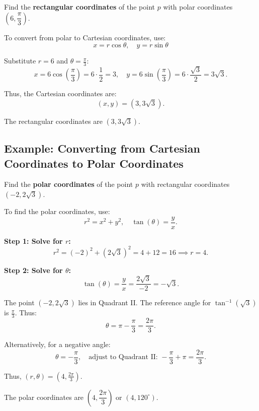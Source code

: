 \documentclass{article}
\begin{document}
\begin{examplebox}
Find the \textbf{rectangular coordinates} of the point \( p \) with polar coordinates \( (6, \dfrac{\pi}{3}) \).

\begin{solutionbox}
To convert from polar to Cartesian coordinates, use:
\[
    x = r \cos \theta, \quad y = r \sin \theta
\]

Substitute \( r = 6 \) and \( \theta = \frac{\pi}{3} \):
\[
    x = 6 \cos\left(\frac{\pi}{3}\right) = 6 \cdot \frac{1}{2} = 3, \quad
    y = 6 \sin\left(\frac{\pi}{3}\right) = 6 \cdot \frac{\sqrt{3}}{2} = 3\sqrt{3}.
\]

Thus, the Cartesian coordinates are:
\[
    (x, y) = (3, 3\sqrt{3}).
\]

\begin{answerbox}
The rectangular coordinates are \( (3, 3\sqrt{3}) \).
\end{answerbox}
\end{solutionbox}
\end{examplebox}

\subsection*{Example: Converting from Cartesian Coordinates to Polar Coordinates}
\begin{examplebox}
Find the \textbf{polar coordinates} of the point \( p \) with rectangular coordinates \( (-2, 2\sqrt{3}) \).

\begin{solutionbox}
To find the polar coordinates, use:
\[
    r^2 = x^2 + y^2, \quad \tan(\theta) = \frac{y}{x}.
\]

\textbf{Step 1: Solve for \( r \):}
\[
    r^2 = (-2)^2 + (2\sqrt{3})^2 = 4 + 12 = 16 \implies r = 4.
\]

\textbf{Step 2: Solve for \( \theta \):}
\[
    \tan(\theta) = \frac{y}{x} = \frac{2\sqrt{3}}{-2} = -\sqrt{3}.
\]

The point \( (-2, 2\sqrt{3}) \) lies in Quadrant II. The reference angle for \( \tan^{-1}(\sqrt{3}) \) is \( \frac{\pi}{3} \). Thus:
\[
    \theta = \pi - \frac{\pi}{3} = \frac{2\pi}{3}.
\]

\begin{tipbox}
    Alternatively, for a negative angle:
    \[
        \theta = -\frac{\pi}{3}, \quad \text{adjust to Quadrant II: } -\frac{\pi}{3} + \pi = \frac{2\pi}{3}.
    \]
\end{tipbox}

Thus, \( (r, \theta) = (4, \frac{2\pi}{3}) \).

\begin{answerbox}
The polar coordinates are \( (4, \dfrac{2\pi}{3}) \) or \( (4, 120^\circ) \).
\end{answerbox}
\end{solutionbox}
\end{examplebox}
\end{document}
